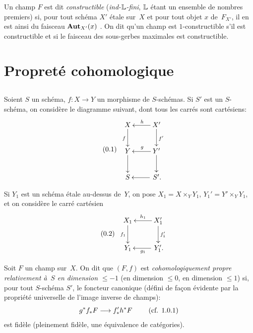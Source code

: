 Un champ $F$ est dit \emph{constructible}
(\emph{\resp ind-$\mathbb{L}$-fini},
$\mathbb{L}$ \'etant un ensemble de nombres premiers) si, pour tout
sch\'ema $X'$ \'etale sur~$X$ et pour tout objet $x$ de~$F_{X'}$,
il en est ainsi du faisceau $\operatorname{\mathbf{Aut}}_{X'}(x)$ \cite[VII 2.2.1]{XIII.2}. On dit
qu'un champ est $1$-constructible
s'il est constructible et si le faisceau des sous-gerbes maximales est
constructible.

\section{Propret\'e cohomologique}
\label{XIII.1}
\setcounter{subsection}{-1}
\subsection{}
\label{XIII.1.0}
Soient $S$ un sch\'ema, $f \colon X \to Y$ un morphisme de
$S$-sch\'emas. Si $S'$ est un $S$-sch\'ema, on consid\`ere le
diagramme suivant, dont tous les carr\'es sont cart\'esiens:
\begin{equation*}
\label{eq:XIII.1.0.1}
\tag{\thesubsection.1}
\begin{array}{c}
\xymatrix{{X}\ar[d]_f&{X'}\ar[l]_h\ar[d]^{f'}\\{Y}\ar[d]&{Y'}\ar[l]_g\ar[d]\\{S}&{\,S'.}\ar[l]}
\end{array}
\end{equation*}

Si $Y_1$ est un sch\'ema \'etale au-dessus de~$Y$, on pose $X_1 =
X \times_Y Y_1$, $Y_1' = Y' \times_Y Y_1$, et on consid\`ere le
carr\'e cart\'esien
\begin{equation*}
\label{eq:XIII.1.0.2}
\tag{\thesubsection.2}
\begin{array}{c}
\xymatrix{{X_1}\ar[d]_{f_1}&{X_1'}\ar[l]_{h_1}\ar[d]^{f_1'}\\{Y_1}&{\,Y_1'.}\ar[l]^{g_1}}
\end{array}
\end{equation*}

\begin{definition}
\label{XIII.1.1}
Soit $F$ un champ sur~$X$. On dit que $(F,f)$ est
\emph{cohomologiquement propre relativement à~$S$ en dimension
$\leqslant -1$}
(\resp en dimension $\leqslant 0$, \resp en dimension $\leqslant 1$)
si, pour tout $S$-sch\'ema $S'$, le foncteur canonique (d\'efini
de fa\c con \'evidente par la propri\'et\'e universelle de
l'image inverse de champs):
$$
g^* f_* F \to f'_* h^* F \qquad\text{ (\cf 1.0.1)}
$$
est fid\`ele (\resp pleinement fid\`ele, \resp une \'equivalence
de cat\'egories).
\end{definition}

